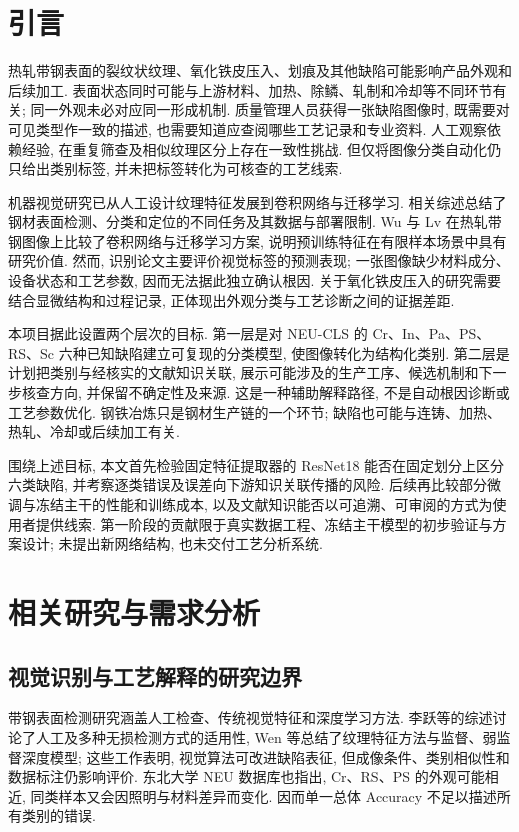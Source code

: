 \documentclass[letterpaper, 10 pt, conference]{ieeeconf}
\begin{document}
\section{引言}
热轧带钢表面的裂纹状纹理、氧化铁皮压入、划痕及其他缺陷可能影响产品外观和后续加工. 表面状态同时可能与上游材料、加热、除鳞、轧制和冷却等不同环节有关; 同一外观未必对应同一形成机制\cite{li-review,tang-review,dey-scale}. 质量管理人员获得一张缺陷图像时, 既需要对可见类型作一致的描述, 也需要知道应查阅哪些工艺记录和专业资料. 人工观察依赖经验, 在重复筛查及相似纹理区分上存在一致性挑战\cite{li-review,wen-survey}. 但仅将图像分类自动化仍只给出类别标签, 并未把标签转化为可核查的工艺线索.

机器视觉研究已从人工设计纹理特征发展到卷积网络与迁移学习. 相关综述总结了钢材表面检测、分类和定位的不同任务及其数据与部署限制\cite{wen-survey,tang-review}. Wu 与 Lv 在热轧带钢图像上比较了卷积网络与迁移学习方案, 说明预训练特征在有限样本场景中具有研究价值\cite{wu-transfer}. 然而, 识别论文主要评价视觉标签的预测表现; 一张图像缺少材料成分、设备状态和工艺参数, 因而无法据此独立确认根因. 关于氧化铁皮压入的研究需要结合显微结构和过程记录, 正体现出外观分类与工艺诊断之间的证据差距\cite{dey-scale}.

本项目据此设置两个层次的目标. 第一层是对 NEU-CLS 的 Cr、In、Pa、PS、RS、Sc 六种已知缺陷建立可复现的分类模型, 使图像转化为结构化类别. 第二层是计划把类别与经核实的文献知识关联, 展示可能涉及的生产工序、候选机制和下一步核查方向, 并保留不确定性及来源. 这是一种辅助解释路径, 不是自动根因诊断或工艺参数优化. 钢铁冶炼只是钢材生产链的一个环节; 缺陷也可能与连铸、加热、热轧、冷却或后续加工有关\cite{tang-review,guo-inclusion,dey-scale}.

围绕上述目标, 本文首先检验固定特征提取器的 ResNet18 能否在固定划分上区分六类缺陷, 并考察逐类错误及误差向下游知识关联传播的风险. 后续再比较部分微调与冻结主干的性能和训练成本, 以及文献知识能否以可追溯、可审阅的方式为使用者提供线索. 第一阶段的贡献限于真实数据工程、冻结主干模型的初步验证与方案设计; 未提出新网络结构, 也未交付工艺分析系统.

\section{相关研究与需求分析}
\subsection{视觉识别与工艺解释的研究边界}
带钢表面检测研究涵盖人工检查、传统视觉特征和深度学习方法. 李跃等的综述讨论了人工及多种无损检测方式的适用性, Wen 等总结了纹理特征方法与监督、弱监督深度模型; 这些工作表明, 视觉算法可改进缺陷表征, 但成像条件、类别相似性和数据标注仍影响评价\cite{li-review,wen-survey}. 东北大学 NEU 数据库也指出, Cr、RS、PS 的外观可能相近, 同类样本又会因照明与材料差异而变化\cite{neu-database}. 因而单一总体 Accuracy 不足以描述所有类别的错误.
\end{document}
